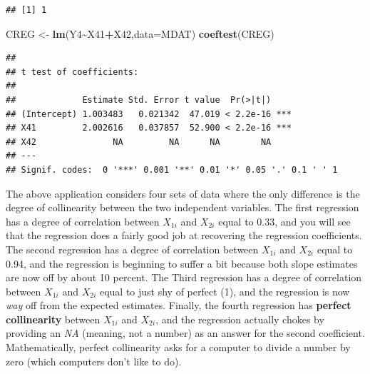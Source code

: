 \documentclass[
]{book}
\newenvironment{Shaded}{\begin{snugshade}}{\end{snugshade}}
\newcommand{\AttributeTok}[1]{\textcolor[rgb]{0.13,0.29,0.53}{#1}}
\newcommand{\CommentTok}[1]{\textcolor[rgb]{0.56,0.35,0.01}{\textit{#1}}}
\newcommand{\FunctionTok}[1]{\textcolor[rgb]{0.13,0.29,0.53}{\textbf{#1}}}
\newcommand{\NormalTok}[1]{#1}
\newcommand{\OtherTok}[1]{\textcolor[rgb]{0.56,0.35,0.01}{#1}}
\newcommand{\SpecialCharTok}[1]{\textcolor[rgb]{0.81,0.36,0.00}{\textbf{#1}}}
\begin{document}
\begin{Shaded}
\end{Shaded}

\begin{verbatim}
## [1] 1
\end{verbatim}

\begin{Shaded}
\begin{Highlighting}[]
\NormalTok{CREG }\OtherTok{\textless{}{-}} \FunctionTok{lm}\NormalTok{(Y4}\SpecialCharTok{\textasciitilde{}}\NormalTok{X41}\SpecialCharTok{+}\NormalTok{X42,}\AttributeTok{data=}\NormalTok{MDAT)}
\FunctionTok{coeftest}\NormalTok{(CREG)}
\end{Highlighting}
\end{Shaded}

\begin{verbatim}
## 
## t test of coefficients:
## 
##             Estimate Std. Error t value  Pr(>|t|)    
## (Intercept) 1.003483   0.021342  47.019 < 2.2e-16 ***
## X41         2.002616   0.037857  52.900 < 2.2e-16 ***
## X42               NA         NA      NA        NA    
## ---
## Signif. codes:  0 '***' 0.001 '**' 0.01 '*' 0.05 '.' 0.1 ' ' 1
\end{verbatim}

The above application considers four sets of data where the only difference is the degree of collinearity between the two independent variables. The first regression has a degree of correlation between \(X_{1i}\) and \(X_{2i}\) equal to 0.33, and you will see that the regression does a fairly good job at recovering the regression coefficients. The second regression has a degree of correlation between \(X_{1i}\) and \(X_{2i}\) equal to 0.94, and the regression is beginning to suffer a bit because both slope estimates are now off by about 10 percent. The Third regression has a degree of correlation between \(X_{1i}\) and \(X_{2i}\) equal to just shy of perfect (1), and the regression is now \emph{way} off from the expected estimates. Finally, the fourth regression has \textbf{perfect collinearity} between \(X_{1i}\) and \(X_{2i}\), and the regression actually chokes by providing an \emph{NA} (meaning, not a number) as an answer for the second coefficient. Mathematically, perfect collinearity asks for a computer to divide a number by zero (which computers don't like to do).
\end{document}
